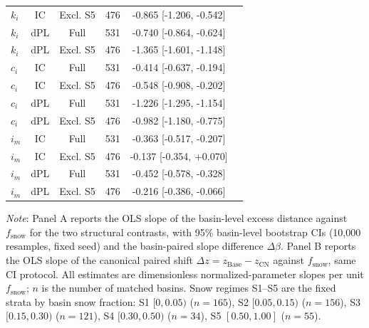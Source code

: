 \begin{table}[t]
\begin{threeparttable}
\begin{tabular}{lccccc}
$k_i$ & IC & Excl. S5 & 476 & -0.865 [-1.206, -0.542] &  \\
$k_i$ & dPL & Full & 531 & -0.740 [-0.864, -0.624] &  \\
$k_i$ & dPL & Excl. S5 & 476 & -1.365 [-1.601, -1.148] &  \\
$c_i$ & IC & Full & 531 & -0.414 [-0.637, -0.194] &  \\
$c_i$ & IC & Excl. S5 & 476 & -0.548 [-0.908, -0.202] &  \\
$c_i$ & dPL & Full & 531 & -1.226 [-1.295, -1.154] &  \\
$c_i$ & dPL & Excl. S5 & 476 & -0.982 [-1.180, -0.775] &  \\
$i_m$ & IC & Full & 531 & -0.363 [-0.517, -0.207] &  \\
$i_m$ & IC & Excl. S5 & 476 & -0.137 [-0.354, +0.070] &  \\
$i_m$ & dPL & Full & 531 & -0.452 [-0.578, -0.328] &  \\
$i_m$ & dPL & Excl. S5 & 476 & -0.216 [-0.386, -0.066] &  \\
\bottomrule
\end{tabular}
\begin{tablenotes}[flushleft]
\small
\item \textit{Note}: Panel A reports the OLS slope of the basin-level excess distance against $f_{\mathrm{snow}}$ for the two structural contrasts, with 95\% basin-level bootstrap CIs (10,000 resamples, fixed seed) and the basin-paired slope difference $\Delta\beta$. Panel B reports the OLS slope of the canonical paired shift $\Delta z = z_{\mathrm{Base}} - z_{\mathrm{CN}}$ against $f_{\mathrm{snow}}$, same CI protocol. All estimates are dimensionless normalized-parameter slopes per unit $f_{\mathrm{snow}}$; $n$ is the number of matched basins. Snow regimes S1--S5 are the fixed strata by basin snow fraction: S1 $[0, 0.05)$ ($n=165$), S2 $[0.05, 0.15)$ ($n=156$), S3 $[0.15, 0.30)$ ($n=121$), S4 $[0.30, 0.50)$ ($n=34$), S5 $[0.50, 1.00]$ ($n=55$).
\end{tablenotes}
\end{threeparttable}
\end{table}
